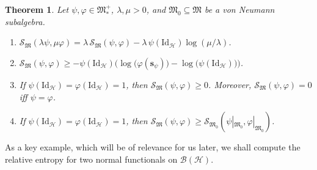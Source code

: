 \documentclass[a4paper, twoside, 11pt, reqno]{amsart}
\theoremstyle{definition}
\theoremstyle{plain}
\newtheorem{theorem}[definition]{Theorem}
\renewcommand{\subset}{\subseteq}
\newcommand{\MH}{\mathcal{H}}
\newcommand{\MS}{\mathcal{S}}
\newcommand{\MFM}{\mathfrak{M}}
\newcommand{\BO}{\mathscr{B}}
\newcommand{\NF}[1]{#1_{\ast}^{+}}
\newcommand{\id}{\mathrm{Id}}
\newcommand{\1}{\mathbf{1}}
\newcommand{\ssupp}{\mathbf{s}}
\begin{document}
\begin{theorem}\label{thm:relEntProperties}
    Let $\psi, \varphi \in \NF{\MFM}$, $\lambda, \mu > 0$, and $\MFM_0 \subset \MFM$ be a von Neumann subalgebra.
    \begin{enumerate}
        \item \label{enu:relEntScaling} $\displaystyle \MS_\MFM(\lambda \psi, \mu \varphi) = \lambda \, \MS_\MFM(\psi, \varphi) - \lambda \, \psi(\id_\MH) \log (\mu / \lambda)$.
        
        \item \label{enu:relEntLowerBound} $\displaystyle \MS_\MFM(\psi, \varphi) \ge - \psi(\id_\MH) \bigl(\log \bigl( \varphi(\ssupp_\psi)\bigr) - \log \bigl(\psi(\id_\MH)\bigr)\bigr)$.        

        \item \label{enu:relEntNonNeg} If $\psi(\id_\MH) = \varphi(\id_\MH) = 1$, then $\MS_\MFM(\psi, \varphi) \ge 0$. Moreover, $\MS_\MFM(\psi, \varphi) = 0$ iff $\psi = \varphi$.

        \item \label{enu:relEntSubalg} If $\psi(\id_\MH) = \varphi(\id_\MH) = 1$, then $\MS_\MFM (\psi, \varphi) \ge \MS_{\MFM_0} (\psi|_{\MFM_0}, \varphi|_{\MFM_0})$.
    \end{enumerate}
\end{theorem}

As a key example, which will be of relevance for us later, we shall compute the relative entropy for two normal functionals on $\BO(\MH)$.
\end{document}
